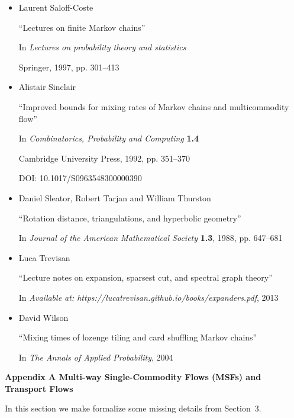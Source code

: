 \documentclass[10pt,a4paper]{article}
\begin{document}
\begin{itemize}
\item[] [Sal97]
Laurent Saloff-Coste

“Lectures on finite Markov chains”

In \emph{Lectures on probability theory and statistics}

Springer, 1997, pp. 301–413


      

\item[] [Sin92]
Alistair Sinclair

“Improved bounds for mixing rates of Markov chains and multicommodity flow”

In \emph{Combinatorics, Probability and Computing} \textbf{1.4}

Cambridge University Press, 1992, pp. 351–370

DOI: 10.1017/S0963548300000390


      

\item[] [STT88]
Daniel Sleator, Robert Tarjan and William Thurston

“Rotation distance, triangulations, and hyperbolic geometry”

In \emph{Journal of the American Mathematical Society} \textbf{1.3}, 1988, pp. 647–681


      

\item[] [Tre13]
Luca Trevisan

“Lecture notes on expansion, sparsest cut, and spectral graph theory”

In \emph{Available at: https://lucatrevisan.github.io/books/expanders.pdf}, 2013


      

\item[] [Wil04]
David Wilson

“Mixing times of lozenge tiling and card shuffling Markov chains”

In \emph{The Annals of Applied Probability}, 2004


    

\end{itemize}




\par\medskip\noindent\textbf{Appendix A Multi-way Single-Commodity Flows (MSFs) and Transport Flows}\par




In this section we make formalize some missing details from Section 3.\par
\end{document}
